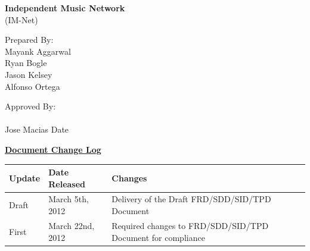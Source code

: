 \documentclass[letterpaper,12pt]{article}
\begin{document}


\begin{center}
{\Large \textbf{Independent Music Network}}\\
(IM-Net)\\
\end{center}

\vspace{3cm}
Prepared By:\\
Mayank Aggarwal\\
Ryan Bogle\\
Jason Kelsey\\
Alfonso Ortega

\vspace{2cm}
Approved By:\\
\vspace{2cm}
\makebox[2in]{\hrulefill}
\hspace{0.5cm}
\makebox[2in]{\hrulefill}\\
Jose Macias
\hspace{1.36in}
Date

\eject

\begin{center}
\underline{\textbf{Document Change Log}}
\end{center}
\begin{tabular}{|l|l|p{5in}|}
\hline 
\textbf{Update} & \textbf{Date Released} & \textbf{Changes} \\ 
\hline 
Draft & March 5th, 2012 & Delivery of the Draft FRD/SDD/SID/TPD Document \\
\hline 
First & March 22nd, 2012 & Required changes to FRD/SDD/SID/TPD Document for compliance \\
\hline 
\end{tabular} 

\eject


\tableofcontents
\listoffigures
\end{document}

